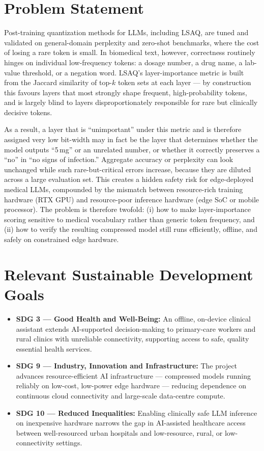 \documentclass[conference]{IEEEtran}
\begin{document}
\section{Problem Statement}
Post-training quantization methods for LLMs, including LSAQ, are tuned and validated on general-domain perplexity and zero-shot benchmarks, where the cost of losing a rare token is small. In biomedical text, however, correctness routinely hinges on individual low-frequency tokens: a dosage number, a drug name, a lab-value threshold, or a negation word. LSAQ's layer-importance metric is built from the Jaccard similarity of top-$k$ token sets at each layer --- by construction this favours layers that most strongly shape frequent, high-probability tokens, and is largely blind to layers disproportionately responsible for rare but clinically decisive tokens.

As a result, a layer that is ``unimportant'' under this metric and is therefore assigned very low bit-width may in fact be the layer that determines whether the model outputs ``5\,mg'' or an unrelated number, or whether it correctly preserves a ``no'' in ``no signs of infection.'' Aggregate accuracy or perplexity can look unchanged while such rare-but-critical errors increase, because they are diluted across a large evaluation set. This creates a hidden safety risk for edge-deployed medical LLMs, compounded by the mismatch between resource-rich training hardware (RTX GPU) and resource-poor inference hardware (edge SoC or mobile processor). The problem is therefore twofold: (i) how to make layer-importance scoring sensitive to medical vocabulary rather than generic token frequency, and (ii) how to verify the resulting compressed model still runs efficiently, offline, and safely on constrained edge hardware.

\section{Relevant Sustainable Development Goals}
\begin{itemize}
    \item \textbf{SDG 3 --- Good Health and Well-Being:} An offline, on-device clinical assistant extends AI-supported decision-making to primary-care workers and rural clinics with unreliable connectivity, supporting access to safe, quality essential health services.
    \item \textbf{SDG 9 --- Industry, Innovation and Infrastructure:} The project advances resource-efficient AI infrastructure --- compressed models running reliably on low-cost, low-power edge hardware --- reducing dependence on continuous cloud connectivity and large-scale data-centre compute.
    \item \textbf{SDG 10 --- Reduced Inequalities:} Enabling clinically safe LLM inference on inexpensive hardware narrows the gap in AI-assisted healthcare access between well-resourced urban hospitals and low-resource, rural, or low-connectivity settings.
\end{itemize}
\end{document}
